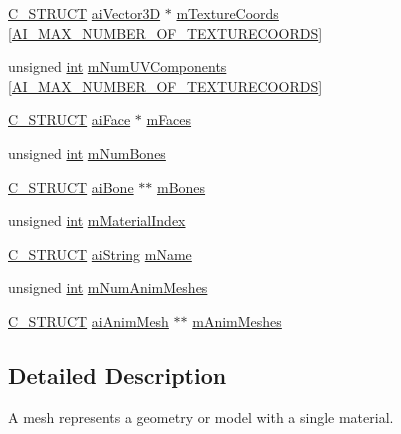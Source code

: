 \begin{DoxyCompactItemize}
\item 
\hyperlink{defs_8h_ab51df4230ceb602bbc1bc109c432a6a0}{C\-\_\-\-S\-T\-R\-U\-C\-T} \hyperlink{structai_vector3_d}{ai\-Vector3\-D} $\ast$ \hyperlink{structai_mesh_a4a50b11d00ef50f419c75cab0f6bddd6}{m\-Texture\-Coords} \mbox{[}\hyperlink{mesh_8h_a335874c5058c7f1e866eb953bf192258}{A\-I\-\_\-\-M\-A\-X\-\_\-\-N\-U\-M\-B\-E\-R\-\_\-\-O\-F\-\_\-\-T\-E\-X\-T\-U\-R\-E\-C\-O\-O\-R\-D\-S}\mbox{]}
\item 
unsigned \hyperlink{_s_d_l__thread_8h_a6a64f9be4433e4de6e2f2f548cf3c08e}{int} \hyperlink{structai_mesh_a635c631a6e66d32989d6b25b2a892d86}{m\-Num\-U\-V\-Components} \mbox{[}\hyperlink{mesh_8h_a335874c5058c7f1e866eb953bf192258}{A\-I\-\_\-\-M\-A\-X\-\_\-\-N\-U\-M\-B\-E\-R\-\_\-\-O\-F\-\_\-\-T\-E\-X\-T\-U\-R\-E\-C\-O\-O\-R\-D\-S}\mbox{]}
\item 
\hyperlink{defs_8h_ab51df4230ceb602bbc1bc109c432a6a0}{C\-\_\-\-S\-T\-R\-U\-C\-T} \hyperlink{structai_face}{ai\-Face} $\ast$ \hyperlink{structai_mesh_a5a65fbc7fdea7f8d36f39047425ece07}{m\-Faces}
\item 
unsigned \hyperlink{_s_d_l__thread_8h_a6a64f9be4433e4de6e2f2f548cf3c08e}{int} \hyperlink{structai_mesh_a0f9d5425b6300e32a842a94f943fd79e}{m\-Num\-Bones}
\item 
\hyperlink{defs_8h_ab51df4230ceb602bbc1bc109c432a6a0}{C\-\_\-\-S\-T\-R\-U\-C\-T} \hyperlink{structai_bone}{ai\-Bone} $\ast$$\ast$ \hyperlink{structai_mesh_a0c0582a7f45b340b6a33552c53232539}{m\-Bones}
\item 
unsigned \hyperlink{_s_d_l__thread_8h_a6a64f9be4433e4de6e2f2f548cf3c08e}{int} \hyperlink{structai_mesh_aa2807c7ba172115203ed16047ad65f9e}{m\-Material\-Index}
\item 
\hyperlink{defs_8h_ab51df4230ceb602bbc1bc109c432a6a0}{C\-\_\-\-S\-T\-R\-U\-C\-T} \hyperlink{structai_string}{ai\-String} \hyperlink{structai_mesh_a8dd9433e0c5b008e3e5aee6c801d3b74}{m\-Name}
\item 
unsigned \hyperlink{_s_d_l__thread_8h_a6a64f9be4433e4de6e2f2f548cf3c08e}{int} \hyperlink{structai_mesh_a1692a300222b32348ae51779df4a697e}{m\-Num\-Anim\-Meshes}
\item 
\hyperlink{defs_8h_ab51df4230ceb602bbc1bc109c432a6a0}{C\-\_\-\-S\-T\-R\-U\-C\-T} \hyperlink{structai_anim_mesh}{ai\-Anim\-Mesh} $\ast$$\ast$ \hyperlink{structai_mesh_a5078f7db7e99ed05db89dfa412f0e990}{m\-Anim\-Meshes}
\end{DoxyCompactItemize}


\subsection{Detailed Description}
A mesh represents a geometry or model with a single material. 

